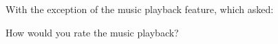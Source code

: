 		With the exception of the music playback feature, which asked:
			\begin{outline}
				\1 How would you rate the music playback? 
			\end{outline}	

